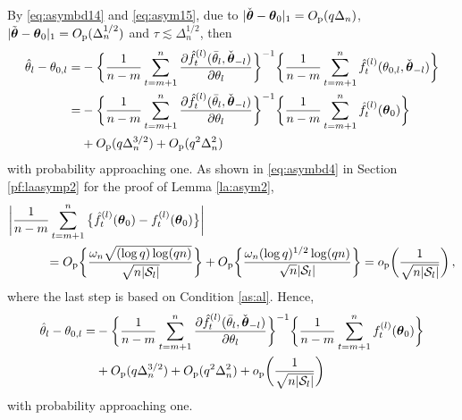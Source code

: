 \documentclass[12pt]{article}
\newcommand{\btheta}{\boldsymbol \theta}
\newcommand{\0}{{\bf 0}}
\begin{document}
By \eqref{eq:asymbd14} and \eqref{eq:asym15}, due to $|\check{\btheta}-\btheta_{0}|_1=O_{\rm p}(q\Delta_n)$, $|\tilde{\btheta}-\btheta_0|_1=O_{\rm p}(\Delta_n^{1/2})$ and $\tau\lesssim \Delta_n^{1/2}$, then
\begin{align*}
\hat{\theta}_l-\theta_{0,l}=&-\bigg\{\frac{1}{n-m}\sum_{t=m+1}^n\frac{\partial\hat{f}_t^{(l)}(\bar{\theta}_l,\check{\btheta}_{-l})}{\partial\theta_l}\bigg\}^{-1}\bigg\{\frac{1}{n-m}\sum_{t=m+1}^n\hat{f}_t^{(l)}(\theta_{0,l},\check{\btheta}_{-l})\bigg\}\\
=&-\bigg\{\frac{1}{n-m}\sum_{t=m+1}^n\frac{\partial\hat{f}_t^{(l)}(\bar{\theta}_l,\check{\btheta}_{-l})}{\partial\theta_l}\bigg\}^{-1}\bigg\{\frac{1}{n-m}\sum_{t=m+1}^n\hat{f}_t^{(l)}(\btheta_{0})\bigg\}\\
&+O_{\rm p}(q\Delta_n^{3/2})+O_{\rm p}(q^2\Delta_n^2)
\end{align*}
with probability approaching one. As shown in \eqref{eq:asymbd4} in Section \ref{pf:laasymp2} for the proof of Lemma \ref{la:asym2}, 
\begin{align*}
&\bigg|\frac{1}{n-m}\sum_{t=m+1}^n\big\{\hat{f}_t^{(l)}(\btheta_0)-f_t^{(l)}(\btheta_0)\big\}\bigg|\\
&~~~~~~~~~=O_{\rm p}\bigg\{\frac{\omega_n\sqrt{(\log q)\log(qn)}}{\sqrt{n|\mathcal{S}_{l}|}}\bigg\}+O_{\rm p}\bigg\{\frac{\omega_n(\log q)^{1/2}\log(qn)}{\sqrt{n}|\mathcal{S}_{l}|}\bigg\}=o_{\rm p}\bigg(\frac{1}{\sqrt{n|\mathcal{S}_l|}}\bigg)\,,
\end{align*}
where the last step is based on Condition \ref{as:al}. 
Hence, \begin{align}
\hat{\theta}_l-\theta_{0,l}
=&-\bigg\{\frac{1}{n-m}\sum_{t=m+1}^n\frac{\partial\hat{f}_t^{(l)}(\bar{\theta}_l,\check{\btheta}_{-l})}{\partial\theta_l}\bigg\}^{-1}\bigg\{\frac{1}{n-m}\sum_{t=m+1}^nf_t^{(l)}(\btheta_{0})\bigg\}\notag\\
&+O_{\rm p}(q\Delta_n^{3/2})+O_{\rm p}(q^2\Delta_n^2)+o_{\rm p}\bigg(\frac{1}{\sqrt{n|\mathcal{S}_l|}}\bigg)\label{eq:asymbd8}
\end{align}
with probability approaching one. 
\end{document}
